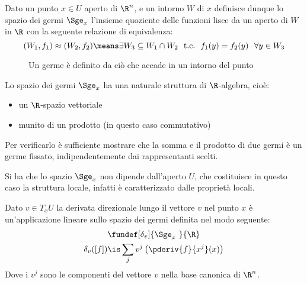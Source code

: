 \begin{defn}
Dato un punto $x\in U$ aperto di $\R ^n$, e un intorno $W$ di $x$ definisce dunque lo spazio dei germi $\Sge_x$ l'insieme quoziente delle funzioni lisce da un aperto di $W$ in $\R$ con la seguente relazione di equivalenza:
\begin{equation*}
(W_1, f_1) \approx (W_2, f_2) \means \exists W_3 \subseteq W_1 \cap W_2\ \ \text{t.c.}\ \ f_1(y)=f_2(y)\ \ \forall y\in W_3
\end{equation*}
\end{defn}

\begin{figure}[h]
\centering

\caption{Un germe è definito da ciò che accade in un intorno del punto}
\end{figure}

Lo spazio dei germi $\Sge_x$ ha una  naturale struttura di $\R$-algebra, cioè:
\begin{itemize}
\item un $\R$-spazio vettoriale
\item munito di un prodotto (in questo caso commutativo)
\end{itemize}
Per verificarlo è sufficiente mostrare che la somma e il prodotto di due germi è un germe fissato, indipendentemente dai rappresentanti scelti.

\begin{oss}
Si ha che lo spazio $\Sge_x$ non dipende dall'aperto $U$, che costituisce in questo caso la struttura locale, infatti è caratterizzato dalle proprietà locali.
\end{oss}

\begin{defn}
Dato $v\in T_x U$ la derivata direzionale lungo il vettore $v$ nel punto $x$ è un'applicazione lineare sullo spazio dei germi definita nel modo seguente:
\begin{gather*}
\fundef[\delta_v]{\Sge_x~}{\R} \\
\delta_v([f]) \is \sum_j v^j \left(\pderiv{f}{x^j}(x)\right)
\end{gather*}
Dove i $v^j$ sono le componenti del vettore $v$ nella base canonica di $\R ^n$.
\end{defn}

